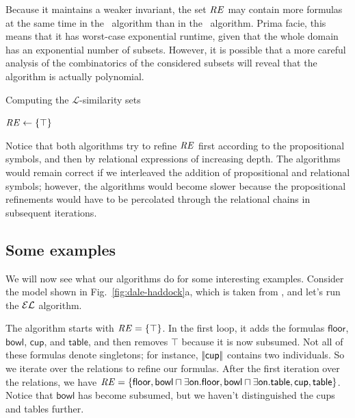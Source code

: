 Because it maintains a weaker invariant, the set $\mathit{RE}$ may contain
more formulas at the same time in the \el\ algorithm than in the \alc\
algorithm.  Prima facie, this means that it has worst-case exponential
runtime, given that the whole domain has an exponential number of
subsets.  However, it is possible that a more careful analysis of the
combinatorics of the considered subsets will reveal that the algorithm
is actually polynomial.

\begin{algorithm}[t]
\dontprintsemicolon
\caption{Computing the $\mathcal{L}$-similarity sets}
\label{algo:bisim-l}

$\mathit{RE} \leftarrow \{\top\}$


\end{algorithm}

Notice that both algorithms try to refine $\mathit{RE}$ first according to the
propositional symbols, and then by relational expressions of
increasing depth.  The algorithms would remain correct if we
interleaved the addition of propositional and relational symbols;
however, the algorithms would become slower because the propositional
refinements would have to be percolated through the relational chains
in subsequent iterations.



\subsection{Some examples}\label{sec:examples}

We will now see what our algorithms do for some interesting
examples. Consider the model shown in Fig.~\ref{fig:dale-haddock}a,
which is taken from \newcite{dale91:_gener_refer_expres_invol_relat},
and let's run the $\mathcal{EL}$ algorithm.




The algorithm starts with $\mathit{RE} = \{\top\}$.  In the first loop, it
adds the formulas $\mathsf{floor}$, $\mathsf{bowl}$, $\mathsf{cup}$,
and $\mathsf{table}$, and then removes $\top$ because it is now
subsumed.  Not all of these formulas denote singletons; for instance,
$|\!|\mathsf{cup}|\!|$ contains two individuals.  So we iterate over
the relations to refine our formulas.  After the first iteration over
the relations, we have $\mathit{RE} = \{ \mathsf{floor}, \mathsf{bowl} \sqcap
\exists \mathsf{on}.\mathsf{floor}, \mathsf{bowl} \sqcap \exists
\mathsf{on}.\mathsf{table}, \mathsf{cup}, \mathsf{table} \}$. Notice
that $\mathsf{bowl}$ has become subsumed, but we haven't distinguished
the cups and tables further.



